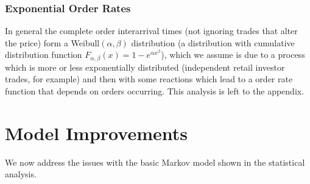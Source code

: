 \documentclass[a4paper,10pt]{article}
\begin{document}
\subsubsection{Exponential Order Rates}
In general the complete order interarrival times (not ignoring trades that alter the price) form a Weibull$(\alpha, \beta)$ distribution (a distribution with cumulative distribution function $F_{\alpha,\beta}(x) = 1 - e^{\alpha x^\beta}$), which we assume is due to a process which is more or less exponentially distributed (independent retail investor trades, for example) and then with some reactions which lead to a order rate function that depends on orders occurring. This analysis is left to the appendix.
\section{Model Improvements}
We now address the issues with the basic Markov model shown in the statistical analysis.
\end{document}
